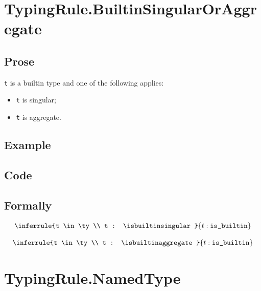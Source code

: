 \documentclass{book}
\begin{document}
\section{TypingRule.BuiltinSingularOrAggregate \label{sec:TypingRule.BuiltinSingularOrAggregate}}

    \subsection{Prose}
    \texttt{t} is a builtin type and one of the following applies:
    \begin{itemize}
    \item \texttt{t} is singular;
    \item \texttt{t} is aggregate.
    \end{itemize}
    
    \subsection{Example}

    \subsection{Code}

\begin{formal}
      \subsection{Formally}
\newcommand\isbuiltin[0]{\texttt{is\_builtin}}
\[
\begin{array}{c}
\inferrule{t \in \ty \\ t : \isbuiltinsingular}{t : \isbuiltin}\\
\\
\inferrule{t \in \ty \\ t : \isbuiltinaggregate}{t : \isbuiltin}\\
\end{array}
\]
\end{formal}

	   
\section{TypingRule.NamedType \label{sec:TypingRule.NamedType} } 
\end{document}
